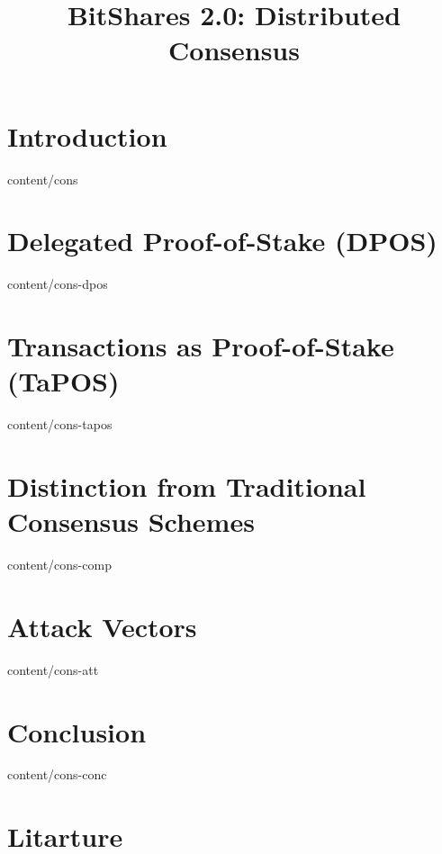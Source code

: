 \documentclass[conference,final,10pt,a4paper]{IEEEtran}
\title{BitShares 2.0: Distributed Consensus}
\author{}
\begin{document}
\sloppy
\maketitle

\begin{abstract}
\end{abstract}
\section    { Introduction                                   }  { content/cons          } 
\section    { Delegated Proof-of-Stake (DPOS)                }  { content/cons-dpos     } 
\section    { Transactions as Proof-of-Stake (TaPOS)         }  { content/cons-tapos    } 
\section    { Distinction from Traditional Consensus Schemes }  { content/cons-comp     } 
\section    { Attack Vectors                                 }  { content/cons-att      } 
\section    { Conclusion                                     }  { content/cons-conc     } 
\section*   { Litarture                                      }


\end{document}
